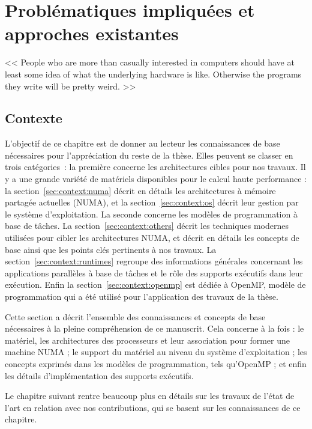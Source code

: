 \part{Problématiques impliquées et approches existantes}

\begin{savequote}[12cm]
<< People who are more than casually interested in computers should have at least some idea of what the underlying hardware is like. Otherwise the programs they write will be pretty weird. >>

\end{savequote}
\chapter{Contexte}\label{chap:contexte}
\chaptertoc
\vfill

\pagebreak

L'objectif de ce chapitre est de donner au lecteur les connaissances de base nécessaires pour l'appréciation du reste de la thèse.
Elles peuvent se classer en trois catégories~: la première concerne les architectures cibles pour nos travaux. Il y a une grande variété de matériels disponibles pour le calcul haute performance : la section~\ref{sec:context:numa} décrit en détails les architectures à mémoire partagée actuelles (NUMA), et la section~\ref{sec:context:os} décrit leur gestion par le système d'exploitation.
La seconde concerne les modèles de programmation à base de tâches. La section~\ref{sec:context:others} décrit les techniques modernes utilisées pour cibler les architectures NUMA, et décrit en détails les concepts de base ainsi que les points clés pertinents à nos travaux.
La section~\ref{sec:context:runtimes} regroupe des informations générales concernant les applications parallèles à base de tâches et le rôle des supports exécutifs dans leur exécution.
Enfin la section~\ref{sec:context:openmp} est dédiée à OpenMP, modèle de programmation qui a été utilisé pour l'application des travaux de la thèse.







\bigskip

Cette section a décrit l'ensemble des connaissances et concepts de base nécessaires à la pleine compréhension de ce manuscrit.
Cela concerne à la fois : le matériel, les architectures des processeurs et leur association pour former une machine NUMA ; le support du matériel au niveau du système d'exploitation ; les concepts exprimés dans les modèles de programmation, tels qu'OpenMP ; et enfin les détails d'implémentation des supports exécutifs.

Le chapitre suivant rentre beaucoup plus en détails sur les travaux de l'état de l'art en relation avec nos contributions, qui se basent sur les connaissances de ce chapitre.
